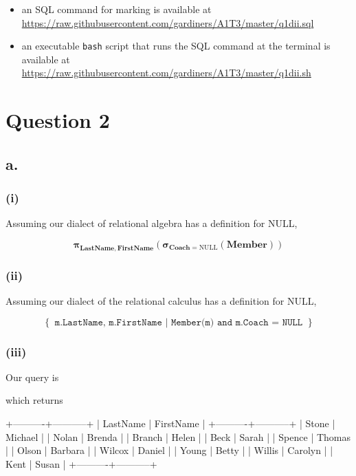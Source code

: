 \documentclass{article}
\newcommand{\select}[1]{
\boldsymbol{\sigma}_{#1}
}
\newcommand{\project}[1]{
\boldsymbol{\pi}_{#1}
}
\begin{document}
\begin{itemize}
    \item an SQL command for marking is available at \url{https://raw.githubusercontent.com/gardiners/A1T3/master/q1dii.sql}
    \item an executable \texttt{bash} script that runs the SQL command at the terminal is available at \url{https://raw.githubusercontent.com/gardiners/A1T3/master/q1dii.sh}
\end{itemize}

\section{Question 2}

\subsection{a.}

\subsubsection{(i)}

Assuming our dialect of relational algebra has a definition for NULL,

$$
\project{\mathbf{LastName, FirstName}}
\left(
\select{\mathbf{Coach} = \text{NULL}}\left(\mathbf{Member}\right)
\right)
$$

\subsubsection{(ii)}

Assuming our dialect of the relational calculus has a definition for NULL,

$$
\left\{
\texttt{ m.LastName, m.FirstName | Member(m) and m.Coach = NULL }
\right\}
$$

\subsubsection{(iii)}

Our query is


which returns

\begin{bashinline}
+----------+-----------+
| LastName | FirstName |
+----------+-----------+
| Stone    | Michael   |
| Nolan    | Brenda    |
| Branch   | Helen     |
| Beck     | Sarah     |
| Spence   | Thomas    |
| Olson    | Barbara   |
| Wilcox   | Daniel    |
| Young    | Betty     |
| Willis   | Carolyn   |
| Kent     | Susan     |
+----------+-----------+
\end{bashinline}
\end{document}
